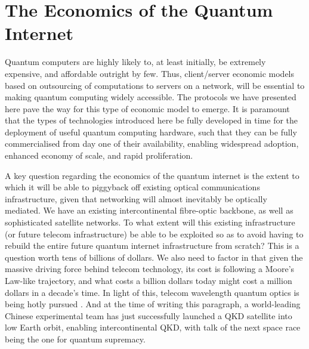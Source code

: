 \documentclass[aps,rmp,twocolumn,amsmath,amssymb,nofootinbib,superscriptaddress]{revtex4}
\begin{document}
%
%

\section{The Economics of the Quantum Internet} \label{sec:economics}

Quantum computers are highly likely to, at least initially, be extremely expensive, and affordable outright by few. Thus, client/server economic models based on outsourcing of computations to servers on a network, will be essential to making quantum computing widely accessible. The protocols we have presented here pave the way for this type of economic model to emerge. It is paramount that the types of technologies introduced here be fully developed in time for the deployment of useful quantum computing hardware, such that they can be fully commercialised from day one of their availability, enabling widespread adoption, enhanced economy of scale, and rapid proliferation.

A key question regarding the economics of the quantum internet is the extent to which it will be able to piggyback off existing optical communications infrastructure, given that networking will almost inevitably be optically mediated. We have an existing intercontinental fibre-optic backbone, as well as sophisticated satellite networks. To what extent will this existing infrastructure (or future telecom infrastructure) be able to be exploited so as to avoid having to rebuild the entire future quantum internet infrastructure from scratch? This is a question worth tens of billions of dollars. We also need to factor in that given the massive driving force behind telecom technology, its cost is following a Moore's Law-like trajectory, and what costs a billion dollars today might cost a million dollars in a decade's time. In light of this, telecom wavelength quantum optics is being hotly pursued \cite{???}. And at the time of writing this paragraph, a world-leading Chinese experimental team has just successfully launched a QKD satellite into low Earth orbit, enabling intercontinental QKD, with talk of the next space race being the one for quantum supremacy.
\end{document}

